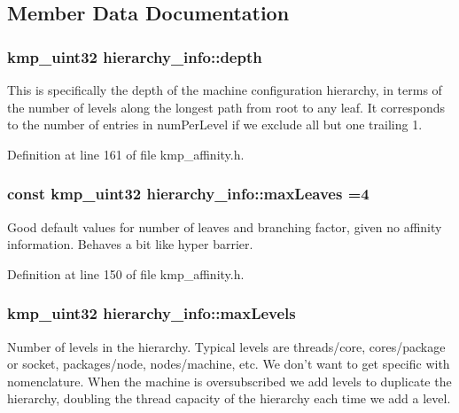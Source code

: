 \subsection{Member Data Documentation}
\hypertarget{classhierarchy__info_aeebcad75a7d471e1b1fd37aab6216f22}{
\subsubsection[{depth}]{\setlength{\rightskip}{0pt plus 5cm}kmp\-\_\-uint32 hierarchy\-\_\-info\-::depth}}\label{classhierarchy__info_aeebcad75a7d471e1b1fd37aab6216f22}
This is specifically the depth of the machine configuration hierarchy, in terms of the number of levels along the longest path from root to any leaf. It corresponds to the number of entries in num\-Per\-Level if we exclude all but one trailing 1. 

Definition at line 161 of file kmp\-\_\-affinity.\-h.

\hypertarget{classhierarchy__info_a4122e10b5d763f2ca3f13076f836ddfe}{
\subsubsection[{max\-Leaves}]{\setlength{\rightskip}{0pt plus 5cm}const kmp\-\_\-uint32 hierarchy\-\_\-info\-::max\-Leaves =4\hspace{0.3cm}{\ttfamily [static]}}}\label{classhierarchy__info_a4122e10b5d763f2ca3f13076f836ddfe}
Good default values for number of leaves and branching factor, given no affinity information. Behaves a bit like hyper barrier. 

Definition at line 150 of file kmp\-\_\-affinity.\-h.

\hypertarget{classhierarchy__info_aafbad4b89a239ea459aaef1ab4908aba}{
\subsubsection[{max\-Levels}]{\setlength{\rightskip}{0pt plus 5cm}kmp\-\_\-uint32 hierarchy\-\_\-info\-::max\-Levels}}\label{classhierarchy__info_aafbad4b89a239ea459aaef1ab4908aba}
Number of levels in the hierarchy. Typical levels are threads/core, cores/package or socket, packages/node, nodes/machine, etc. We don't want to get specific with nomenclature. When the machine is oversubscribed we add levels to duplicate the hierarchy, doubling the thread capacity of the hierarchy each time we add a level. 

